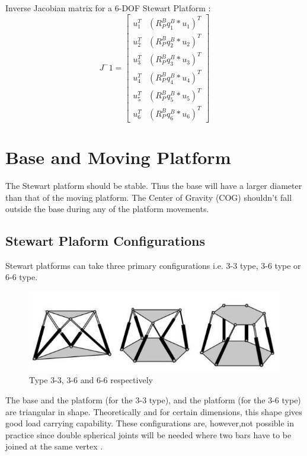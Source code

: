 Inverse Jacobian matrix for a 6-DOF Stewart Platform
\cite{csumnu2017simulation}:
\[ J^-1 =
\begin{bmatrix}
u_{1}^{T} & (R_{P}^{B}q_{1}^{B} * u_{1})^T\\
u_{2}^{T} & (R_{P}^{B}q_{2}^{B} * u_{2})^T\\
u_{3}^{T} & (R_{P}^{B}q_{3}^{B} * u_{3})^T\\
u_{4}^{T} & (R_{P}^{B}q_{4}^{B} * u_{4})^T\\
u_{5}^{T} & (R_{P}^{B}q_{5}^{B} * u_{5})^T\\
u_{6}^{T} & (R_{P}^{B}q_{6}^{B} * u_{6})^T
\end{bmatrix}
\]
\section{Base and Moving Platform}
 The Stewart platform should be stable. Thus the base will have a larger diameter than that of the moving platform. The Center of Gravity (COG) shouldn't fall outside the base during any of the platform movements.
\subsection{Stewart Plaform Configurations}
Stewart platforms can take three primary configurations i.e. 3-3 type, 3-6 type or 6-6 type.
\begin{center}
	\begin{figure}[!h]
	\centering
	\includegraphics{Figures/stewart}
	\caption[Configurations]{Type 3-3, 3-6 and 6-6 respectively
	\cite{fernandes_design_nodate}}
	\end{figure}
\end{center}
The base and the platform (for the 3-3 type), and the platform (for the 3-6 type) are triangular in shape. Theoretically and for certain dimensions, this shape gives good load carrying capability. These configurations are, however,not possible in practice since double spherical joints will be needed where two bars have to be joined at the same vertex
\cite{fernandes_design_nodate}.

